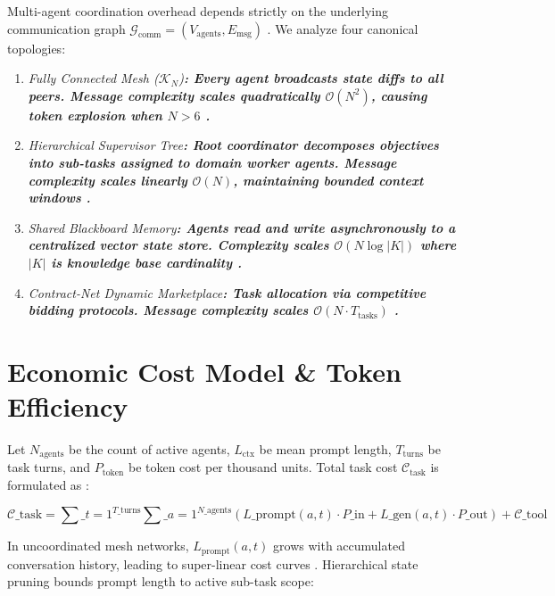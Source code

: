 \documentclass[10pt,twocolumn,letterpaper]{article}
\begin{document}
Multi-agent coordination overhead depends strictly on the underlying communication graph $\mathcal{G}_{\text{comm}} = (V_{\text{agents}}, E_{\text{msg}})$ \cite{arxiv_2203_08975}. We analyze four canonical topologies:

\begin{enumerate}
  \item \textit{Fully Connected Mesh ($\mathcal{K}_N$)\textbf{: Every agent broadcasts state diffs to all peers. Message complexity scales quadratically $\mathcal{O}(N^2)$, causing token explosion when $N > 6$ \cite{arxiv_2412_06333}.}}
  \item \textit{Hierarchical Supervisor Tree\textbf{: Root coordinator decomposes objectives into sub-tasks assigned to domain worker agents. Message complexity scales linearly $\mathcal{O}(N)$, maintaining bounded context windows \cite{arxiv_2406_00584}.}}
  \item \textit{Shared Blackboard Memory\textbf{: Agents read and write asynchronously to a centralized vector state store. Complexity scales $\mathcal{O}(N \log |K|)$ where $|K|$ is knowledge base cardinality \cite{crossref_10_1145_3689096_3689462}.}}
  \item \textit{Contract-Net Dynamic Marketplace\textbf{: Task allocation via competitive bidding protocols. Message complexity scales $\mathcal{O}(N \cdot T_{\text{tasks}})$ \cite{arxiv_2404_01131}.}}
\end{enumerate}


\section{Economic Cost Model \& Token Efficiency}


Let $N_{\text{agents}}$ be the count of active agents, $L_{\text{ctx}}$ be mean prompt length, $T_{\text{turns}}$ be task turns, and $P_{\text{token}}$ be token cost per thousand units. Total task cost $\mathcal{C}_{\text{task}}$ is formulated as \cite{arxiv_2406_00584}:

\begin{equation}
\mathcal{C}\_{\text{task}} = \sum\_{t=1}^{T\_{\text{turns}}} \sum\_{a=1}^{N\_{\text{agents}}} \left( L\_{\text{prompt}}(a, t) \cdot P\_{\text{in}} + L\_{\text{gen}}(a, t) \cdot P\_{\text{out}} \right) + \mathcal{C}\_{\text{tool}}
\end{equation}

In uncoordinated mesh networks, $L_{\text{prompt}}(a, t)$ grows with accumulated conversation history, leading to super-linear cost curves \cite{arxiv_2501_02497}. Hierarchical state pruning bounds prompt length to active sub-task scope:
\end{document}
